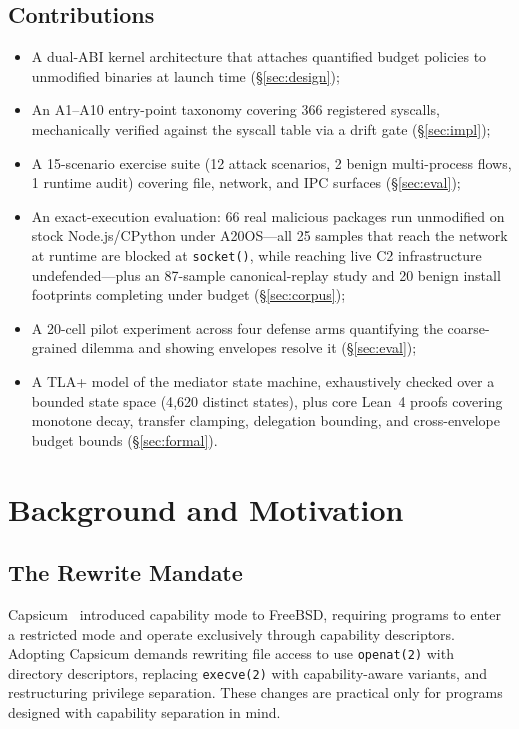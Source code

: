 \documentclass[letterpaper,twocolumn,10pt]{article}
\begin{document}
\subsection{Contributions}

\begin{itemize}
\item A dual-ABI kernel architecture that attaches quantified budget
      policies to unmodified binaries at launch time (\S\ref{sec:design});
\item An A1--A10 entry-point taxonomy covering 366 registered syscalls,
      mechanically verified against the syscall table via a drift gate
      (\S\ref{sec:impl});
\item A 15-scenario exercise suite (12 attack scenarios, 2 benign
      multi-process flows, 1 runtime audit) covering file, network,
      and IPC surfaces (\S\ref{sec:eval});
\item An exact-execution evaluation: 66 real malicious packages run
      unmodified on stock Node.js/CPython under A20OS---all 25 samples
      that reach the network at runtime are blocked at
      \texttt{socket()}, while reaching live C2 infrastructure
      undefended---plus an 87-sample canonical-replay study and 20
      benign install footprints completing under budget
      (\S\ref{sec:corpus});
\item A 20-cell pilot experiment across four defense arms quantifying
      the coarse-grained dilemma and showing envelopes resolve it
      (\S\ref{sec:eval});
\item A TLA+ model of the mediator state machine, exhaustively checked
      over a bounded state space (4{,}620 distinct states), plus core
      Lean~4 proofs covering monotone decay, transfer clamping, delegation bounding, and cross-envelope budget bounds
      (\S\ref{sec:formal}).
\end{itemize}

\section{Background and Motivation}
\label{sec:bg}

\subsection{The Rewrite Mandate}

Capsicum~\cite{watson2010capsicum} introduced capability mode to
FreeBSD, requiring programs to enter a restricted mode and operate
exclusively through capability descriptors.  Adopting Capsicum demands
rewriting file access to use \texttt{openat(2)} with directory
descriptors, replacing \texttt{execve(2)} with capability-aware
variants, and restructuring privilege separation.  These changes are
practical only for programs designed with capability separation in mind.
\end{document}
